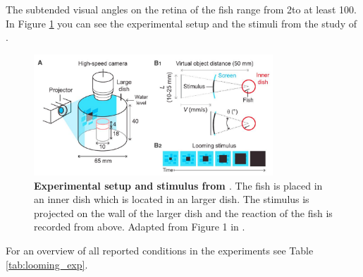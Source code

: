 	The subtended visual angles on the retina of the fish range from 2\textdegree to at least 
	100\textdegree.
    In Figure \ref{fig:expm_setup} you can see the experimental setup and the stimuli from the study of \cite{Bhattacharyya2017}.
    \begin{figure}[H]
    	\begin{center}
			\includegraphics[width=0.8\textwidth]{bhattacharyya_exp_setup.jpeg}
    	\end{center}
    	\caption{\textbf{Experimental setup and stimulus from \cite{Bhattacharyya2017}}. The fish is placed in an inner dish which is located in an larger dish. The stimulus is projected on the wall of the larger dish and the reaction of the fish is recorded from above. Adapted from Figure 1 in \cite{Bhattacharyya2017}.}
    	\label{fig:expm_setup}
    \end{figure}
	For an overview of all reported conditions in the experiments see Table \ref{tab:looming_exp}.\\
